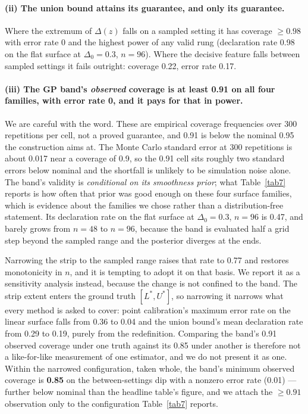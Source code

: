 \documentclass[pdflatex,iicol,sn-apa]{sn-jnl}
\theoremstyle{remark}
\begin{document}
\paragraph{(ii) The union bound attains its guarantee, and only its guarantee.}
Where the extremum of $\Delta(z)$ falls on a sampled setting it has coverage $\ge 0.98$ with error
rate 0 and the highest power of any valid rung (declaration rate 0.98 on the flat surface at
$\Delta_0 = 0.3$, $n = 96$). Where the decisive feature falls between sampled settings it fails
outright: coverage 0.22, error rate 0.17.

\paragraph{(iii) The GP band's \emph{observed} coverage is at least 0.91 on all four families, with
error rate 0, and it pays for that in power.}
We are careful with the word. These are empirical coverage frequencies over 300 repetitions per
cell, not a proved guarantee, and 0.91 is below the nominal 0.95 the construction aims at. The Monte
Carlo standard error at 300 repetitions is about 0.017 near a coverage of 0.9, so the 0.91 cell sits
roughly two standard errors below nominal and the shortfall is unlikely to be simulation noise
alone. The band's validity is \emph{conditional on its smoothness prior}; what Table~\ref{tab7}
reports is how often that prior was good enough on these four surface families, which is evidence
about the families we chose rather than a distribution-free statement.
Its declaration rate on the flat surface at $\Delta_0 = 0.3$, $n = 96$ is 0.47, and barely grows
from $n = 48$ to $n = 96$, because the band is evaluated half a grid step beyond the sampled range
and the posterior diverges at the ends.

Narrowing the strip to the sampled range raises that rate to 0.77 and restores monotonicity in $n$,
and it is tempting to adopt it on that basis. We report it as a sensitivity analysis instead,
because the change is not confined to the band. The strip extent enters the ground truth
$[L^*, U^*]$, so narrowing it narrows what every method is asked to cover: point calibration's
maximum error rate on the linear surface falls from 0.36 to 0.04 and the union bound's mean
declaration rate from 0.29 to 0.19, purely from the redefinition. Comparing the band's 0.91 observed
coverage under one truth against its 0.85 under another is therefore not a like-for-like measurement
of one estimator, and we do not present it as one. Within the narrowed configuration, taken whole,
the band's minimum observed coverage is \textbf{0.85} on the between-settings dip with a nonzero
error rate (0.01) --- further below nominal than the headline table's figure, and we attach the
$\ge 0.91$ observation only to the configuration Table~\ref{tab7} reports.
\end{document}
